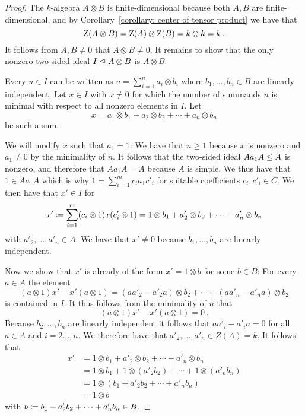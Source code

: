 \begin{proof}
  The $k$-algebra $A \otimes B$ is finite-dimensional because both $A, B$ are finite-di\-men\-si\-o\-nal, and by Corollary~\ref{corollary: center of tensor product} we have that
  \[
      \operatorname{Z}(A \otimes B)
    = \operatorname{Z}(A) \otimes \operatorname{Z}(B)
    = k \otimes k
    = k \,.
  \]
  It follows from $A, B \neq 0$ that $A \otimes B \neq 0$.
  It remains to show that the only nonzero two-sided ideal $I \trianglelefteq A \otimes B$ is $A \otimes B$:
  
  Every $u \in I$ can be written as $u = \sum_{i=1}^n a_i \otimes b_i$ where $b_1, \dotsc, b_n \in B$ are linearly independent.
  Let $x \in I$ with $x \neq 0$ for which the number of summands $n$ is minimal with respect to all nonzero elements in $I$.
  Let
  \begin{equation}
    \label{eqn: u as a sum}
      x
    = a_1 \otimes b_1 + a_2 \otimes b_2 + \dotsb + a_n \otimes b_n
  \end{equation}
  be such a sum.
  
  We will modify $x$ such that $a_1 = 1$:
  We have that $n \geq 1$ because $x$ is nonzero and $a_1 \neq 0$ by the minimality of $n$.
  It follows that the two-sided ideal $A a_1 A \trianglelefteq A$ is nonzero, and therefore that $A a_1 A = A$ because $A$ is simple.
  We thus have that $1 \in A a_1 A$ which is why $1 = \sum_{i=1}^m c_i a_1 c'_i$ for suitable coefficients $c_i, c'_i \in C$.
  We then have that $x' \in I$ for
  \[
              x'
    \coloneqq  \sum_{i=1}^m (c_i \otimes 1) x (c'_i \otimes 1)
    =         1 \otimes b_1 + a'_2 \otimes b_2 + \dotsb + a'_n \otimes b_n
  \]
  with $a'_2, \dotsc, a'_n \in A$.
  We have that $x' \neq 0$ because $b_1, \dotsc, b_n$ are linearly independent.
  
  Now we show that $x'$ is already of the form $x' = 1 \otimes b$ for some $b \in B$:
  For every $a \in A$ the element
  \[
        (a \otimes 1) x' - x' (a \otimes 1)
    =     (a a'_2 - a'_2 a) \otimes b_2
        + \dotsb
        + (a a'_n - a'_n a) \otimes b_2
  \]
  is contained in $I$.
  It thus follows from the minimality of $n$ that
  \[
      (a \otimes 1) x' - x' (a \otimes 1)
    = 0 \,.
  \]
  Because $b_2, \dotsc, b_n$ are linearly independent it follows that $a a'_i - a'_i a = 0$ for all $a \in A$ and $i = 2 \dotsc, n$.
  We therefore have that $a'_2, \dotsc, a'_n \in Z(A) = k$.
  It follows that
  \begin{align*}
        x'
    &=  1 \otimes b_1 + a'_2 \otimes b_2 + \dotsb + a'_n \otimes b_n  \\
    &=  1 \otimes b_1 + 1 \otimes (a'_2 b_2) + \dotsb + 1 \otimes (a'_n b_n)  \\
    &=  1 \otimes (b_1 + a'_2 b_2 + \dotsb + a'_n b_n)  \\
    &=  1 \otimes b
  \end{align*}
  with $b \coloneqq b_1 + a'_2 b_2 + \dotsb + a'_n b_n \in B$.
  

\end{proof}

